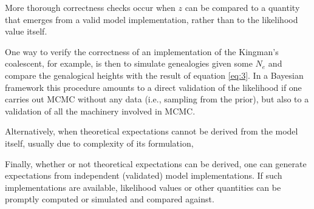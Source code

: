 \documentclass[oneside]{article}
\begin{document}
More thorough correctness checks occur when $z$ can be
compared to a quantity that emerges from a valid model implementation,
rather than to the likelihood value itself.






One way to verify the correctness of an implementation of the Kingman's
coalescent, for example, is then to simulate genealogies given some
$N_e$ and compare the genalogical heights with the result of equation
\ref{eq:3}.
In a Bayesian framework this procedure amounts to a direct validation of the
likelihood if one carries out MCMC without any data (i.e., sampling
from the prior), but also to a validation of all the machinery involved in MCMC.

Alternatively, when theoretical expectations cannot be derived from
the model itself, usually due to complexity of its formulation, {\color{red}{[Place holder for Christiaan's text]}}

Finally, whether or not theoretical expectations can be
derived, one can generate expectations from independent (validated) model implementations.
If such implementations are available, likelihood values or other
quantities can be promptly computed or simulated and compared against.
\end{document}
